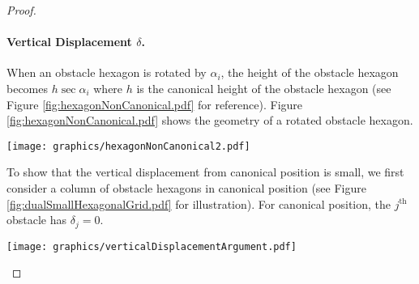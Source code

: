 \documentclass[10pt]{CSUNthesis}
\theoremstyle{plain}%
\theoremstyle{definition}
\theoremstyle{remark}
\newcommand{\jth}{j^\text{th}}
\begin{document}
\begin{proof}
\paragraph{Vertical Displacement $\delta$.}

When an obstacle hexagon is rotated by $\alpha_i$, the height of the obstacle hexagon becomes $h \sec \alpha_i$ where $h$ is the canonical height of the obstacle hexagon (see Figure \ref{fig:hexagonNonCanonical.pdf} for reference).
Figure \ref{fig:hexagonNonCanonical.pdf} shows the geometry of a rotated obstacle hexagon.

\begin{minipage}{\linewidth}
\begin{center}
\texttt{[image: graphics/hexagonNonCanonical2.pdf]}
\label{fig:hexagonNonCanonical.pdf}
\end{center}
\end{minipage}

To show that the vertical displacement from canonical position is small, we first consider a column of obstacle hexagons in canonical position (see Figure \ref{fig:dualSmallHexagonalGrid.pdf} for illustration).  
For canonical position, the $\jth$ obstacle has $\delta_j = 0$.

\begin{minipage}{\linewidth}
\begin{center}
\texttt{[image: graphics/verticalDisplacementArgument.pdf]}
\label{fig:verticalDisplacementArgument.pdf}
\end{center}
\end{minipage}


\end{proof}
\end{document}
